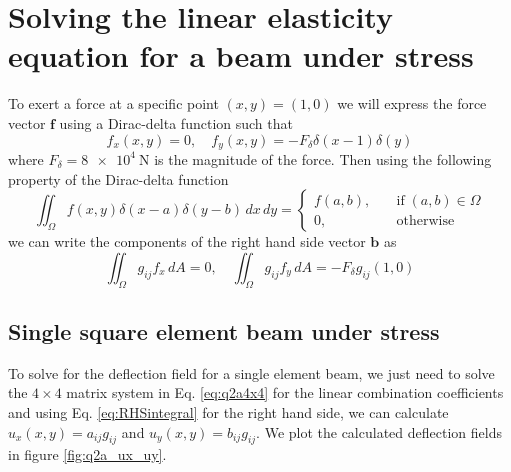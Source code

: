 \documentclass[11pt]{article}
\begin{document}
\section{Solving the linear elasticity equation for a beam under stress}
To exert a force at a specific point $(x,y) = (1,0)$ we will express the force vector $\bm{f}$ using a Dirac-delta function such that
\begin{equation}
  f_x(x,y) = 0, \quad f_y(x,y) = -F_\delta \delta(x-1)\delta(y)
\end{equation}
where $F_\delta = \SI{8e4}{\N}$ is the magnitude of the force. Then using the following property of the Dirac-delta function
\begin{equation}
  \iint_\Omega f(x,y) \delta(x-a) \delta(y-b) \, dx \, dy =
  \begin{cases}
  	f(a,b), \quad &\mathrm{if} \; (a,b) \in \Omega \\
  	0, \quad &\mathrm{otherwise}
  \end{cases}
\end{equation}
we can write the components of the right hand side vector $\bm{b}$ as
\begin{equation} \label{eq:RHSintegral}
  \iint_\Omega g_{ij} f_x \, dA = 0, \quad 
  \iint_\Omega g_{ij} f_y \, dA = -F_\delta g_{ij}(1,0)
\end{equation}

\subsection{Single square element beam under stress}
To solve for the deflection field for a single element beam, we just need to solve the $4\times4$ matrix system in Eq. \eqref{eq:q2a4x4} for the linear combination coefficients and using Eq. \eqref{eq:RHSintegral} for the right hand side, we can calculate $u_x(x,y) = a_{ij}g_{ij}$ and $u_y(x,y) = b_{ij}g_{ij}$. We plot the calculated deflection fields in figure \ref{fig:q2a_ux_uy}.
\end{document}
